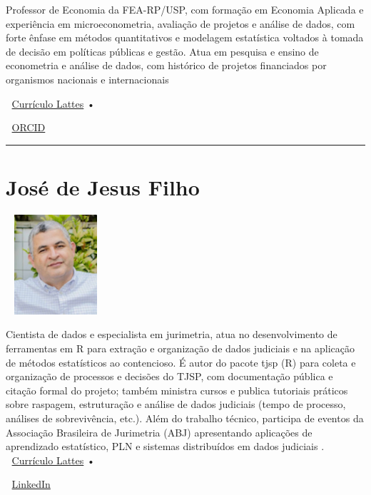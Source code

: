 \documentclass[
  letterpaper,
  DIV=11,
  numbers=noendperiod]{scrreprt}
\begin{document}
Professor de Economia da FEA-RP/USP, com formação em Economia Aplicada e
experiência em microeconometria, avaliação de projetos e análise de
dados, com forte ênfase em métodos quantitativos e modelagem estatística
voltados à tomada de decisão em políticas públicas e gestão. Atua em
pesquisa e ensino de econometria e análise de dados, com histórico de
projetos financiados por organismos nacionais e internacionais

📘 \href{https://lattes.cnpq.br/1375868138002604}{Currículo Lattes} •

🔗 \href{https://orcid.org/0000-0002-1006-6527}{ORCID}

\begin{center}\rule{0.5\linewidth}{0.5pt}\end{center}

\section{\texorpdfstring{\textbf{José de Jesus
Filho}}{José de Jesus Filho}}\label{josuxe9-de-jesus-filho}

\includegraphics[width=1.45833in,height=1.45833in]{figuras/jjesus.jpg}

Cientista de dados e especialista em jurimetria, atua no desenvolvimento
de ferramentas em R para extração e organização de dados judiciais e na
aplicação de métodos estatísticos ao contencioso. É autor do pacote tjsp
(R) para coleta e organização de processos e decisões do TJSP, com
documentação pública e citação formal do projeto; também ministra cursos
e publica tutoriais práticos sobre raspagem, estruturação e análise de
dados judiciais (tempo de processo, análises de sobrevivência, etc.).
Além do trabalho técnico, participa de eventos da Associação Brasileira
de Jurimetria (ABJ) apresentando aplicações de aprendizado estatístico,
PLN e sistemas distribuídos em dados judiciais .\\
📘 \href{https://lattes.cnpq.br/YYYYYYYYY}{Currículo Lattes} •

🔗 \href{https://linkedin.com/in/XXXX}{LinkedIn}

\end{document}
